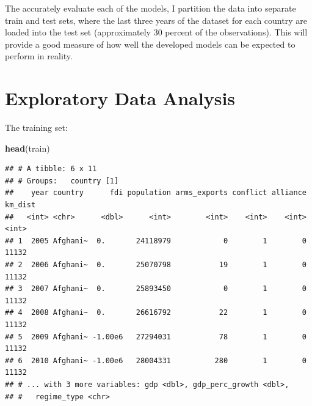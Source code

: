 \documentclass[11pt,]{article}
\newenvironment{Shaded}{\begin{snugshade}}{\end{snugshade}}
\newcommand{\CharTok}[1]{\textcolor[rgb]{0.31,0.60,0.02}{#1}}
\newcommand{\CommentTok}[1]{\textcolor[rgb]{0.56,0.35,0.01}{\textit{#1}}}
\newcommand{\DataTypeTok}[1]{\textcolor[rgb]{0.13,0.29,0.53}{#1}}
\newcommand{\DecValTok}[1]{\textcolor[rgb]{0.00,0.00,0.81}{#1}}
\newcommand{\KeywordTok}[1]{\textcolor[rgb]{0.13,0.29,0.53}{\textbf{#1}}}
\newcommand{\NormalTok}[1]{#1}
\newcommand{\OperatorTok}[1]{\textcolor[rgb]{0.81,0.36,0.00}{\textbf{#1}}}
\newcommand{\OtherTok}[1]{\textcolor[rgb]{0.56,0.35,0.01}{#1}}
\newcommand{\StringTok}[1]{\textcolor[rgb]{0.31,0.60,0.02}{#1}}
\begin{document}
The accurately evaluate each of the models, I partition the data into
separate train and test sets, where the last three years of the dataset
for each country are loaded into the test set (approximately 30 percent
of the observations). This will provide a good measure of how well the
developed models can be expected to perform in reality.

\begin{Shaded}
\end{Shaded}

\hypertarget{exploratory-data-analysis}{%
\section{Exploratory Data Analysis}\label{exploratory-data-analysis}}

The training set:

\begin{Shaded}
\begin{Highlighting}[]
\KeywordTok{head}\NormalTok{(train)}
\end{Highlighting}
\end{Shaded}

\begin{verbatim}
## # A tibble: 6 x 11
## # Groups:   country [1]
##    year country      fdi population arms_exports conflict alliance km_dist
##   <int> <chr>      <dbl>      <int>        <int>    <int>    <int>   <int>
## 1  2005 Afghani~  0.       24118979            0        1        0   11132
## 2  2006 Afghani~  0.       25070798           19        1        0   11132
## 3  2007 Afghani~  0.       25893450            0        1        0   11132
## 4  2008 Afghani~  0.       26616792           22        1        0   11132
## 5  2009 Afghani~ -1.00e6   27294031           78        1        0   11132
## 6  2010 Afghani~ -1.00e6   28004331          280        1        0   11132
## # ... with 3 more variables: gdp <dbl>, gdp_perc_growth <dbl>,
## #   regime_type <chr>
\end{verbatim}
\end{document}

